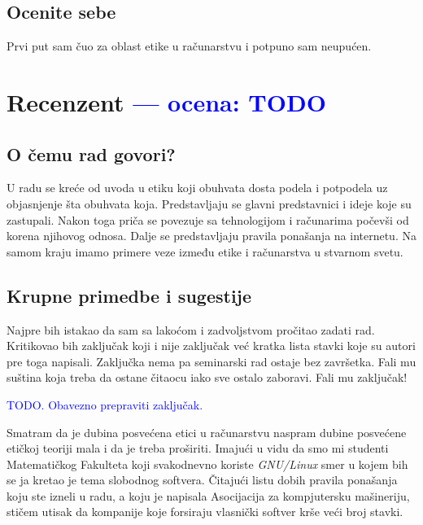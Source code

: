 \documentclass[a4paper]{report}
\newcommand{\odgovor}[1]{\textcolor{blue}{#1}}
\begin{document}
\section{Ocenite sebe}
Prvi put sam čuo za oblast etike u računarstvu i potpuno sam neupućen.


\chapter{Recenzent \odgovor{--- ocena: TODO} }


\section{O čemu rad govori?}
U radu se kreće od uvoda u etiku koji obuhvata dosta podela i potpodela uz objasnjenje šta obuhvata koja. Predstavljaju
se glavni predstavnici i ideje koje su zastupali. Nakon toga priča se povezuje sa tehnologijom i računarima počevši od
korena njihovog odnosa. Dalje se predstavljaju pravila ponašanja na internetu. Na samom kraju imamo primere veze
između etike i računarstva u stvarnom svetu.

\section{Krupne primedbe i sugestije}
Najpre bih istakao da sam sa lakoćom i zadvoljstvom pročitao zadati rad. Kritikovao bih zaključak koji i nije zaključak već 
kratka lista stavki koje su autori pre toga napisali. Zaključka nema pa seminarski rad ostaje bez završetka. Fali mu suština 
koja treba da ostane čitaocu iako sve ostalo zaboravi. Fali mu zaključak! \par

\odgovor{TODO. Obavezno prepraviti zaključak.}

Smatram da je dubina posvećena etici u računarstvu naspram dubine posvećene etičkoj teoriji mala i da je treba proširiti. 
Imajući u vidu da smo mi studenti Matematičkog Fakulteta koji svakodnevno koriste \textit{GNU/Linux} smer u kojem bih se ja kretao je tema 
slobodnog softvera. Čitajući listu dobih pravila ponašanja koju ste izneli u radu, a koju je napisala Asocijacija za kompjutersku 
mašineriju, stičem utisak da kompanije koje forsiraju vlasnički softver krše veći broj stavki. \par
\end{document}
